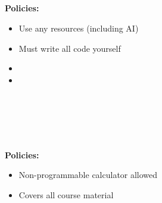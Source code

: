 \documentclass[mathserif, handout]{beamer}
\begin{document}
\begin{frame}
\begin{center}
\Large {} \\
  \\
 \\
 \\
\end{center}
\vspace{0.5cm}

\vspace{0.5cm}

\textbf{Policies:}
\begin{itemize}
    \item Use any resources (including AI)
    \item Must write all code yourself
    \item {}
    \item {}
\end{itemize}

\end{frame}

\begin{frame}
\begin{center}
\Large {} \\
  \\
 \\
 \\
\end{center}
\vspace{0.5cm}

\textbf{Policies:}
\begin{itemize}
    \item Non-programmable calculator allowed
    \item Covers all course material
\end{itemize}

\end{frame}
\end{document}
